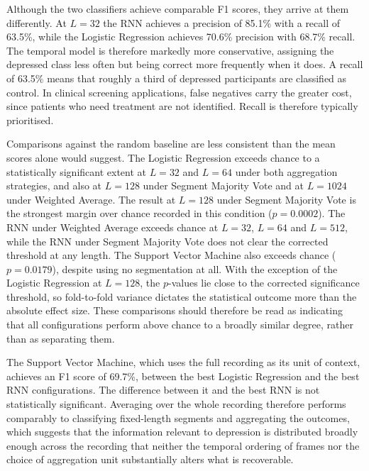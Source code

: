 \documentclass{mproj}
\begin{document}
Although the two classifiers achieve comparable F1 scores, they arrive at them differently. At $L = 32$ the RNN achieves a precision of 85.1\% with a recall of 63.5\%, while the Logistic Regression achieves 70.6\% precision with 68.7\% recall. The temporal model is therefore markedly more conservative, assigning the depressed class less often but being correct more frequently when it does. A recall of 63.5\% means that roughly a third of depressed participants are classified as control. In clinical screening applications, false negatives carry the greater cost, since patients who need treatment are not identified. Recall is therefore typically prioritised.

Comparisons against the random baseline are less consistent than the mean scores alone would suggest. The Logistic Regression exceeds chance to a statistically significant extent at $L = 32$ and $L = 64$ under both aggregation strategies, and also at $L = 128$ under Segment Majority Vote and at $L = 1024$ under Weighted Average. The result at $L = 128$ under Segment Majority Vote is the strongest margin over chance recorded in this condition ($p = 0.0002$). The RNN under Weighted Average exceeds chance at $L = 32$, $L = 64$ and $L = 512$, while the RNN under Segment Majority Vote does not clear the corrected threshold at any length. The Support Vector Machine also exceeds chance ($p = 0.0179$), despite using no segmentation at all. With the exception of the Logistic Regression at $L = 128$, the $p$-values lie close to the corrected significance threshold, so fold-to-fold variance dictates the statistical outcome more than the absolute effect size. These comparisons should therefore be read as indicating that all configurations perform above chance to a broadly similar degree, rather than as separating them.

The Support Vector Machine, which uses the full recording as its unit of context, achieves an F1 score of 69.7\%, between the best Logistic Regression and the best RNN configurations. The difference between it and the best RNN is not statistically significant. Averaging over the whole recording therefore performs comparably to classifying fixed-length segments and aggregating the outcomes, which suggests that the information relevant to depression is distributed broadly enough across the recording that neither the temporal ordering of frames nor the choice of aggregation unit substantially alters what is recoverable.
\end{document}
